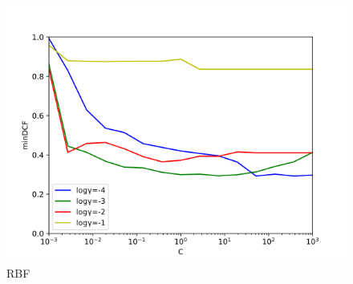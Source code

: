 \documentclass[english]{report}
\begin{document}
\begin{figure}[h!]
    \includegraphics[scale = 0.5]{../../images/validation/SVM_RBF_minDCF_comparison}
    \centering
    \caption{RBF}
    \label{fig:RBF_valid}
\end{figure}
\end{document}
